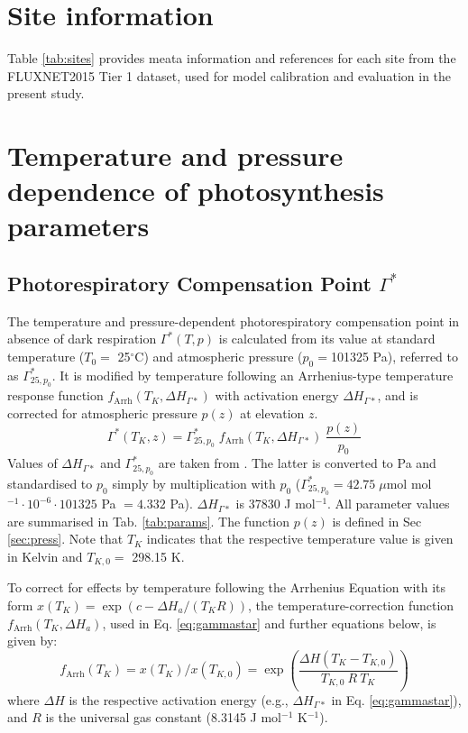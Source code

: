 \documentclass[gmd, manuscript]{copernicus}
\begin{document}
\appendix
\section{Site information}

Table \ref{tab:sites} provides meata information and references for each site from the FLUXNET2015 Tier 1 dataset, used for model calibration and evaluation in the present study.


\section{Temperature and pressure dependence of photosynthesis parameters}

\subsection{Photorespiratory Compensation Point $\Gamma^\ast$}
\label{sec:gammastar}
The temperature and pressure-dependent photorespiratory compensation point in absence of dark respiration $\Gamma^\ast(T,p)$ is calculated from its value at standard temperature ($T_0=$ 25${^\circ}$C) and atmospheric pressure ($p_0 = $101325 Pa), referred to as $\Gamma^\ast_{25, p_0}$. It is modified by temperature following an Arrhenius-type temperature response function $f_{\text{Arrh}}(T_K, \Delta H_{\Gamma\ast})$ with activation energy $\Delta H_{\Gamma\ast}$, and is corrected for atmospheric pressure $p(z)$ at elevation $z$. 
\begin{equation}
\label{eq:gammastar}
    \Gamma^\ast (T_K, z) = \Gamma^\ast_{25, p_0} \; f_{\text{Arrh}}(T_K, \Delta H_{\Gamma\ast}) \; \frac{p(z)}{p_0}
\end{equation}
Values of $\Delta H_{\Gamma\ast}$ and $\Gamma^\ast_{25, p_0}$ are taken from \citet{bernacchi01}. The latter is converted to Pa and standardised to $p_0$ simply by multiplication with $p_0$ ($\Gamma^\ast_{25, p_0} = 42.75\; \mu$mol mol$^{-1} \cdot 10^{-6} \cdot 101325$ Pa $ = 4.332$ Pa). $\Delta H_{\Gamma\ast}$ is 37830 J mol$^{-1}$. All parameter values are summarised in Tab. \ref{tab:params}. The function $p(z)$ is defined in Sec \ref{sec:press}. Note that $T_K$ indicates that the respective temperature value is given in Kelvin and $T_{K,0}=$ 298.15 K.

To correct for effects by temperature following the Arrhenius Equation with its form $x(T_K)=\exp(c-\Delta H_a/(T_K R))$, the temperature-correction function $f_{\text{Arrh}}(T_K, \Delta H_a)$, used in Eq. \ref{eq:gammastar} and further equations below, is given by:
\begin{equation}
    f_{\text{Arrh}}(T_K) = x(T_K)/x(T_{K,0}) = \exp \left( \frac{\Delta H (T_K - T_{K,0})}{T_{K,0}\: R\: T_K} \right) 
\end{equation}
where $\Delta H$ is the respective activation energy (e.g., $\Delta H_{\Gamma\ast}$ in Eq. \ref{eq:gammastar}), and $R$ is the universal gas constant (8.3145 J mol$^{-1}$ K$^{-1}$).
\end{document}
